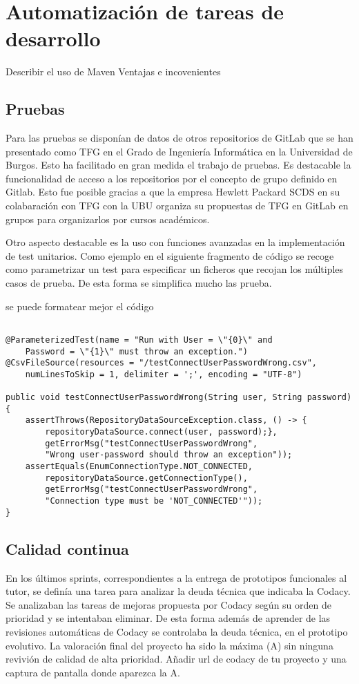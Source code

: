 \section{Automatización de tareas de desarrollo}
\todo Describir el uso de Maven Ventajas e incovenientes
\subsection{Pruebas}
Para las pruebas se disponían de datos de otros repositorios de GitLab que se han presentado como TFG en el Grado de Ingeniería Informática en la 
Universidad de Burgos. Esto ha facilitado en gran medida el trabajo de pruebas. 
Es destacable la funcionalidad de acceso a los repositorios por el concepto de grupo definido en Gitlab. Esto fue posible gracias a que la empresa Hewlett Packard SCDS en su colabaración con TFG con la UBU organiza su propuestas de TFG en GitLab en grupos para organizarlos por cursos académicos.



Otro aspecto destacable es la uso con funciones avanzadas en la implementación de test unitarios. 
Como ejemplo en el siguiente fragmento de código se recoge como parametrizar un test para especificar un ficheros que recojan los múltiples casos de prueba.
De esta forma se simplifica mucho las prueba.

\todo se puede formatear mejor el código 
\tiny{
\begin{lstlisting}

@ParameterizedTest(name = "Run with User = \"{0}\" and 
	Password = \"{1}\" must throw an exception.")
@CsvFileSource(resources = "/testConnectUserPasswordWrong.csv", 
	numLinesToSkip = 1, delimiter = ';', encoding = "UTF-8")
						
public void testConnectUserPasswordWrong(String user, String password){
	assertThrows(RepositoryDataSourceException.class, () -> {
		repositoryDataSource.connect(user, password);},
		getErrorMsg("testConnectUserPasswordWrong", 
		"Wrong user-password should throw an exception"));
	assertEquals(EnumConnectionType.NOT_CONNECTED, 
		repositoryDataSource.getConnectionType(),
		getErrorMsg("testConnectUserPasswordWrong", 
		"Connection type must be 'NOT_CONNECTED'"));
}
\end{lstlisting}		

}

 

\subsection{Calidad continua}
En los últimos sprints, correspondientes a la entrega de prototipos funcionales al tutor,
se definía una tarea para analizar la deuda técnica que indicaba la Codacy.
Se analizaban las tareas de mejoras propuesta por Codacy según su orden de prioridad y se intentaban eliminar.
De esta forma además de aprender de las revisiones automáticas de Codacy se controlaba la deuda técnica, en el prototipo evolutivo.
La valoración final del proyecto ha sido la máxima (A) sin ninguna revivión de calidad de alta prioridad.
\todo Añadir url de codacy de tu proyecto y una captura de pantalla donde aparezca la A.

